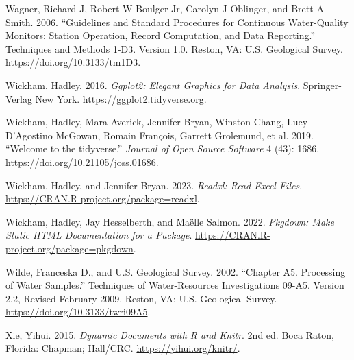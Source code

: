 \begin{CSLReferences}{1}{0}
\leavevmode{}%
Wagner, Richard J, Robert W Boulger Jr, Carolyn J Oblinger, and Brett A Smith. 2006. {``Guidelines and Standard Procedures for Continuous Water-Quality Monitors: Station Operation, Record Computation, and Data Reporting.''} Techniques and Methods 1-D3. Version 1.0. Reston, VA: U.S. Geological Survey. \url{https://doi.org/10.3133/tm1D3}.

\leavevmode{}%
Wickham, Hadley. 2016. \emph{Ggplot2: Elegant Graphics for Data Analysis}. Springer-Verlag New York. \url{https://ggplot2.tidyverse.org}.

\leavevmode{}%
Wickham, Hadley, Mara Averick, Jennifer Bryan, Winston Chang, Lucy D'Agostino McGowan, Romain François, Garrett Grolemund, et al. 2019. {``Welcome to the {tidyverse}.''} \emph{Journal of Open Source Software} 4 (43): 1686. \url{https://doi.org/10.21105/joss.01686}.

\leavevmode{}%
Wickham, Hadley, and Jennifer Bryan. 2023. \emph{Readxl: Read Excel Files}. \url{https://CRAN.R-project.org/package=readxl}.

\leavevmode{}%
Wickham, Hadley, Jay Hesselberth, and Maëlle Salmon. 2022. \emph{Pkgdown: Make Static HTML Documentation for a Package}. \url{https://CRAN.R-project.org/package=pkgdown}.

\leavevmode{}%
Wilde, Franceska D., and U.S. Geological Survey. 2002. {``Chapter A5. Processing of Water Samples.''} Techniques of Water-Resources Investigations 09-A5. Version 2.2, Revised February 2009. Reston, VA: U.S. Geological Survey. \url{https://doi.org/10.3133/twri09A5}.

\leavevmode{}%
Xie, Yihui. 2015. \emph{Dynamic Documents with {R} and Knitr}. 2nd ed. Boca Raton, Florida: Chapman; Hall/CRC. \url{https://yihui.org/knitr/}.

\end{CSLReferences}



\address{%
Marcus W. Beck\\
Tampa Bay Estuary Program\\%
263 13th Ave S\\ St.~Petersburg, Florida, USA 33701\\
%
\url{https://tbep.org}\\%
\textit{ORCiD: \href{https://orcid.org/0000-0002-4996-0059}{0000-0002-4996-0059}}\\%
\href{mailto:mbeck@tbep.org}{\nolinkurl{mbeck@tbep.org}}%
}

